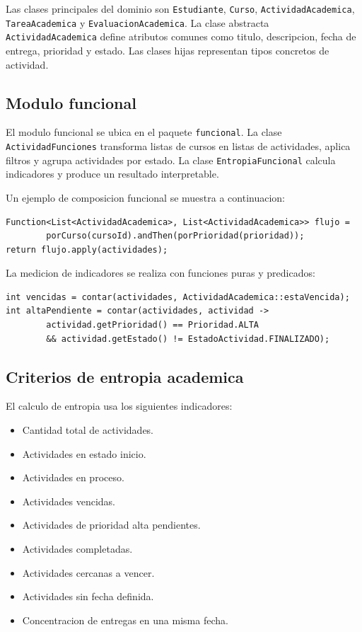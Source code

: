 \documentclass[12pt]{article}
\begin{document}
Las clases principales del dominio son \texttt{Estudiante}, \texttt{Curso}, \texttt{ActividadAcademica}, \texttt{TareaAcademica} y \texttt{EvaluacionAcademica}. La clase abstracta \texttt{ActividadAcademica} define atributos comunes como titulo, descripcion, fecha de entrega, prioridad y estado. Las clases hijas representan tipos concretos de actividad.

\subsection{Modulo funcional}

El modulo funcional se ubica en el paquete \texttt{funcional}. La clase \texttt{ActividadFunciones} transforma listas de cursos en listas de actividades, aplica filtros y agrupa actividades por estado. La clase \texttt{EntropiaFuncional} calcula indicadores y produce un resultado interpretable.

Un ejemplo de composicion funcional se muestra a continuacion:

\begin{lstlisting}[style=java]
Function<List<ActividadAcademica>, List<ActividadAcademica>> flujo =
        porCurso(cursoId).andThen(porPrioridad(prioridad));
return flujo.apply(actividades);
\end{lstlisting}

La medicion de indicadores se realiza con funciones puras y predicados:

\begin{lstlisting}[style=java]
int vencidas = contar(actividades, ActividadAcademica::estaVencida);
int altaPendiente = contar(actividades, actividad ->
        actividad.getPrioridad() == Prioridad.ALTA
        && actividad.getEstado() != EstadoActividad.FINALIZADO);
\end{lstlisting}

\subsection{Criterios de entropia academica}

El calculo de entropia usa los siguientes indicadores:

\begin{itemize}
    \item Cantidad total de actividades.
    \item Actividades en estado inicio.
    \item Actividades en proceso.
    \item Actividades vencidas.
    \item Actividades de prioridad alta pendientes.
    \item Actividades completadas.
    \item Actividades cercanas a vencer.
    \item Actividades sin fecha definida.
    \item Concentracion de entregas en una misma fecha.
\end{itemize}
\end{document}
